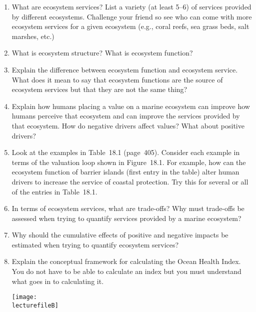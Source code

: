 \documentclass[letterpaper]{tufte-handout}
\newcommand\lecturefileB{434_lecture02_instructor}
\begin{document}
\begin{enumerate}

	\item What are ecosystem services?%
	List a variety (at least 5–6) of services 
	provided by different ecosystems. Challenge your friend so see who can come 
	with more ecosystem services for a given ecosystem (e.g., coral reefs, sea
	grass beds, salt marshes, etc.)
	
	\item What is ecosystem structure? What is ecosystem function?
	
	\item Explain the difference between ecosystem function and ecosystem service.
	What does it mean to say that ecosystem functions are the source of 
	ecosystem services but that they are not the same thing?
	
	\item Explain%
	how humans placing a value on a marine ecosystem can improve how 
	humans perceive that ecosystem and can improve the services provided by that
	ecosystem. How do negative drivers affect values? What about positive drivers?
	
	\item Look at the examples in Table~18.1 (page~405). Consider each example
	in terms of the valuation loop shown in Figure~18.1. For example, how
	can the ecosystem function of barrier islands (first entry in the table)
	alter human drivers to increase the service of coastal protection. Try this
	for several or all of the entries in Table~18.1.
	
	\item In terms of ecosystem services, what are trade-offs? Why must trade-offs 
	be assessed when trying to quantify services provided by a marine ecosystem?
	
	

	\item Why%
	should the cumulative effects of positive and negative impacts be
	estimated when trying to quantify ecosystem services?
	
	\item Explain%
	the conceptual framework for calculating the Ocean Health Index. You do not
	have to be able to calculate an index but you must understand what goes in
	to calculating it.

	\begin{marginfigure}
	\texttt{[image: \\lecturefileB]}
	\end{marginfigure}
	

\end{enumerate}
\end{document}
